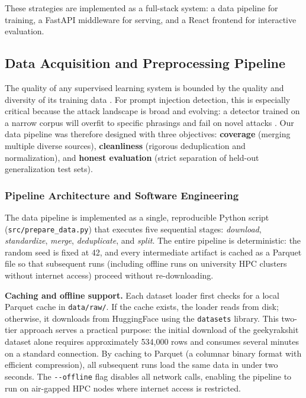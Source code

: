 \documentclass[12pt, letterpaper]{article}   %
\begin{document}
These strategies are implemented as a full-stack system: a data pipeline for training, a FastAPI middleware for serving, and a React frontend for interactive evaluation.


\subsection{Data Acquisition and Preprocessing Pipeline}

The quality of any supervised learning system is bounded by the quality and diversity of its training data \cite{ref1}\cite{ref28}. For prompt injection detection, this is especially critical because the attack landscape is broad and evolving: a detector trained on a narrow corpus will overfit to specific phrasings and fail on novel attacks \cite{ref10}. Our data pipeline was therefore designed with three objectives: \textbf{coverage} (merging multiple diverse sources), \textbf{cleanliness} (rigorous deduplication and normalization), and \textbf{honest evaluation} (strict separation of held-out generalization test sets).

\subsubsection{Pipeline Architecture and Software Engineering}

The data pipeline is implemented as a single, reproducible Python script (\texttt{src/prepare\_data.py}) that executes five sequential stages: \textit{download}, \textit{standardize}, \textit{merge}, \textit{deduplicate}, and \textit{split}. The entire pipeline is deterministic: the random seed is fixed at 42, and every intermediate artifact is cached as a Parquet file so that subsequent runs (including offline runs on university HPC clusters without internet access) proceed without re-downloading.

\textbf{Caching and offline support.} Each dataset loader first checks for a local Parquet cache in \texttt{data/raw/}. If the cache exists, the loader reads from disk; otherwise, it downloads from HuggingFace using the \texttt{datasets} library. This two-tier approach serves a practical purpose: the initial download of the geekyrakshit dataset alone requires approximately 534,000 rows and consumes several minutes on a standard connection. By caching to Parquet (a columnar binary format with efficient compression), all subsequent runs load the same data in under two seconds. The \texttt{-{}-offline} flag disables all network calls, enabling the pipeline to run on air-gapped HPC nodes where internet access is restricted.
\end{document}
